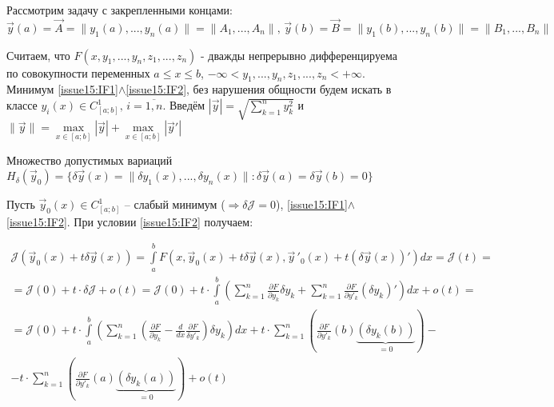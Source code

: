     Рассмотрим задачу с закрепленными концами: 
    \begin{equation} \label{issue15:IF2}
    	\vec{y}(a) = \vec{A} = \| y_1(a), ..., y_n(a)\| = \| A_1, ..., A_n\|,\, \vec{y}(b) = \vec{B} = \| y_1(b), ..., y_n(b)\| = \| B_1, ..., B_n \|
    \end{equation}
    
    Считаем, что $F(x, y_1, ..., y_n, z_1, ..., z_n)$ - дважды непрерывно дифференцируема по совокупности переменных $a \leqslant x \leqslant b$, $-\infty < y_1, ..., y_n, z_1, ..., z_n < +\infty$. 
    Минимум \eqref{issue15:IF1}$\wedge$\eqref{issue15:IF2}, без нарушения общности будем искать в классе $y_i(x) \in C^1_{[a;b]}, \, i = \overline{1, n}$. 
    Введём $|\vec{y}| = \sqrt{\sum \limits_{k=1}^{n} y^2_k}$ и $\|\vec{y}\| = \max \limits_{x \in [a;b]} |\vec{y}| + \max \limits_{x \in [a;b]} | \vec{y}' |$ 
    
    Множество допустимых вариаций $H_{\delta}(\vec{y}_0) = \{\delta \vec{y}(x) = \| \delta y_1 (x), ..., \delta y_n(x)\|: \delta \vec{y}(a) = \delta \vec{y}(b) = 0 \}$
    
    Пусть $\vec{y}_0(x) \in C^1_{[a;b]}$ -- слабый минимум ($\Rightarrow \delta \mathcal{J} = 0$), \eqref{issue15:IF1}$\wedge$\eqref{issue15:IF2}. При условии \eqref{issue15:IF2} получаем:
    
    \begin{multline*}
            \mathcal{J}(\vec{y}_0(x) + t \delta \vec{y}(x)) = \int \limits_a^b F(x, \vec{y}_0(x) + t\delta \vec{y}(x), \vec{y}\,'_0(x) + t(\delta \vec{y}(x))')dx = \mathcal{J}(t) = \\ 
            = \mathcal{J}(0) + t \cdot \delta\mathcal{J} + o(t) = \mathcal{J}(0) + t \cdot \int \limits_a^b \left( \sum \limits_{k =1}^n \frac{\partial F}{\partial y_k} \delta y_k + \sum \limits_{k=1}^n \frac{\partial F}{\partial y'_k} (\delta y_k)' \right) dx + o(t) = \\ 
            = \mathcal{J}(0) + t \cdot \int \limits_a^b \left( \sum \limits_{k = 1}^n \left( \frac{\partial F}{\partial y_k} - \frac{d}{dx} \frac{\partial F}{\delta y'_k}  \right) \delta y_k \right) dx
            + t \cdot \sum \limits_{k = 1}^n \left( \frac{\partial F}{\partial y'_k}(b) \underbrace{(\delta y_k (b))}_{= 0} \right) - \\ 
            - t \cdot \sum \limits_{k = 1}^n \left( \frac{\partial F}{\partial y'_k}(a) \underbrace{(\delta y_k (a))}_{= 0} \right) + o(t) 
    \end{multline*}

